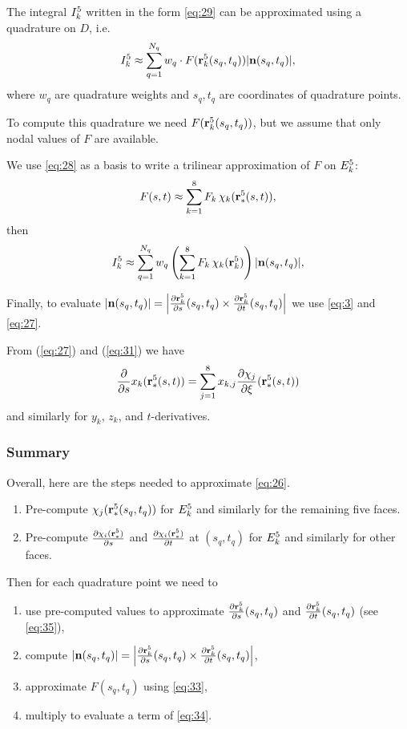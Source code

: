 \documentclass[11pt]{article}
\begin{document}
The integral $I_{k}^{5}$ written in the form \eqref{eq:29} can be approximated
using a quadrature on $D$, i.e.
\begin{equation}
\label{eq:32}
I_{k}^{5} \approx \sum_{q=1}^{N_{q}} w_{q}\cdot F(\mathbf{r}_{k}^{5}(s_{q}, t_{q})) | \mathbf{n}(s_{q},t_{q}) |,
\end{equation}
where $w_{q}$ are quadrature weights and $s_{q}, t_{q}$ are
coordinates of quadrature points.

To compute this quadrature we need $F(\mathbf{r}_{k}^{5}(s_{q}, t_{q}))$, but we
assume that only nodal values of $F$ are available.

We use \eqref{eq:28} as a basis to write a trilinear approximation of $F$ on $E_{k}^{5}$:
\begin{equation}
\label{eq:33}
F(s,t) \approx \sum_{k=1}^{8} F_{k}\,\chi_{k}(\mathbf{r}_{*}^{5}(s,t)),
\end{equation}
then
\begin{equation}
\label{eq:34}
I_{k}^{5} \approx \sum_{q=1}^{N_{q}} w_{q}\left( \sum_{k=1}^{8} F_{k}\,\chi_{k}(\mathbf{r}_{k}^{5}) \right) | \mathbf{n}(s_{q},t_{q}) |,
\end{equation}

Finally, to evaluate $|\mathbf{n}(s_{q}, t_{q})| = \left| \frac{\partial \mathbf{r}_{k}^{5}}{\partial s}(s_{q}, t_{q}) \times
\frac{\partial \mathbf{r}_{k}^{5}}{\partial t}(s_{q}, t_{q}) \right|$ we use \eqref{eq:3} and \eqref{eq:27}.

From (\ref{eq:27}) and (\ref{eq:31}) we have
\begin{equation}
  \label{eq:35}
  \frac{\partial }{\partial s}x_{k}(\mathbf{r}_{*}^{5}(s,t)) = \sum_{j=1}^{8}x_{k,j}\frac{\partial \chi_{j}}{\partial \xi}(\mathbf{r}_{*}^{5}(s,t))
\end{equation}
and similarly for $y_{k}$, $z_{k}$, and $t$-derivatives.

\subsubsection{Summary}
\label{sec:summary}

Overall, here are the steps needed to approximate \eqref{eq:26}.

\begin{enumerate}
\item Pre-compute $\chi_{j}(\mathbf{r}_{*}^{5}(s_{q}, t_{q}))$ for $E_{k}^{5}$ and similarly
for the remaining five faces.
\item Pre-compute $\frac{\partial \chi_{i}(\mathbf{r}_{*}^{5})}{\partial s}$ and
$\frac{\partial \chi_{i}(\mathbf{r}_{*}^{5})}{\partial t}$ at $(s_{q}, t_{q})$ for $E_{k}^{5}$ and similarly for
other faces.
\end{enumerate}

Then for each quadrature point we need to

\begin{enumerate}
\item use pre-computed values to approximate $\frac{\partial \mathbf{r}_{k}^{5}}{\partial s}(s_{q},t_{q})$ and
$\frac{\partial \mathbf{r}_{k}^{5}}{\partial t}(s_{q},t_{q})$ (see \eqref{eq:35}),
\item compute $|\mathbf{n}(s_{q}, t_{q})| = \left| \frac{\partial \mathbf{r}_{k}^{5}}{\partial s}(s_{q}, t_{q}) \times \frac{\partial \mathbf{r}_{k}^{5}}{\partial t}(s_{q}, t_{q}) \right|$,
\item approximate $F(s_{q}, t_{q})$ using \eqref{eq:33},
\item multiply to evaluate a term of \eqref{eq:34}.
\end{enumerate}
\end{document}
